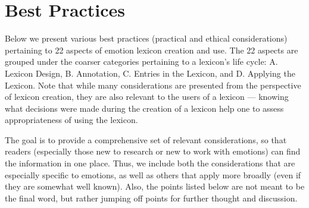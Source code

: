 \documentclass[11pt]{article}
\newcommand{\sm}[1]{{\color{black} #1}} %
\begin{document}




\section{Best Practices}
\noindent Below we present various best practices (practical and ethical considerations) pertaining to 22 aspects of emotion lexicon creation and use. The 22 aspects are grouped under the coarser categories 
pertaining to a lexicon's life cycle:
A. Lexicon Design, B. Annotation, C. Entries in the Lexicon, and D. Applying the Lexicon. 
Note that while many considerations are presented from the perspective of lexicon creation, they are also relevant to the users of a lexicon --- knowing what decisions were made during the creation of a lexicon help one to assess appropriateness of using the lexicon. 

\sm{The goal %
is to provide a comprehensive set of relevant considerations, so that readers (especially those new to research or new to work with emotions) can find 
the information in one place. Thus, we include both the considerations that are especially specific to emotions, as well as others that apply more broadly (even if they are somewhat well known).} 
Also, the points listed below are not meant to be  
the final word,
but rather jumping off points for further thought and discussion. %
\end{document}
